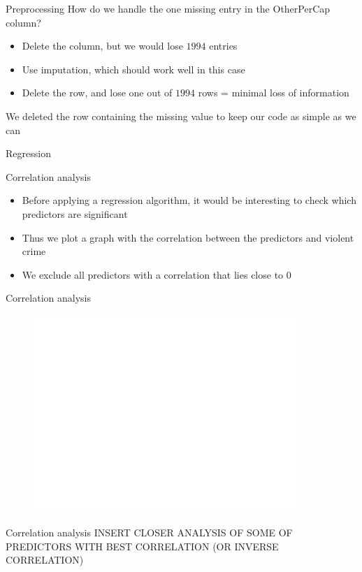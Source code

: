 \documentclass{beamer}
\begin{document}
	\begin{frame}{Preprocessing}
		How do we handle the one missing entry in the OtherPerCap column?
		\begin{itemize}
			\item Delete the column, but we would lose $1994$ entries
			\item Use imputation, which should work well in this case
			\item Delete the row, and lose one out of $1994$ rows = minimal loss of information
		\end{itemize}
		We deleted the row containing the missing value to keep our code as simple as we can
	\end{frame}
	\begin{frame}{Regression}
              
        \end{frame}
	\begin{frame}{Correlation analysis}
		\begin{itemize}
			\item Before applying a regression algorithm, it would be interesting to check which predictors are significant
			\item Thus we plot a graph with the correlation between the predictors and violent crime
			\item We exclude all predictors with a correlation that lies close to $0$
		\end{itemize}
	\end{frame}
	\begin{frame}{Correlation analysis}
		\begin{figure}[h]
			\includegraphics[width=10cm]{correlation.png}
			\centering
		\end{figure}
	\end{frame}
	\begin{frame}{Correlation analysis}
		INSERT CLOSER ANALYSIS OF SOME OF PREDICTORS WITH BEST CORRELATION (OR INVERSE CORRELATION)
	\end{frame}
\end{document}
